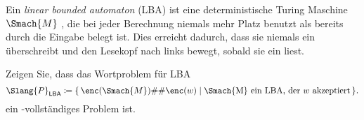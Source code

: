 \documentclass[german]{latteachCD}[2017/03/28]
\begin{document}
\begin{exercise}
  Ein \emph{linear bounded automaton} (LBA) ist eine deterministische Turing
  Maschine $\Smach{M}$ , die bei jeder Berechnung niemals mehr Platz benutzt als
  bereits durch die Eingabe belegt ist.  Dies erreicht  dadurch, dass
  sie niemals ein \textvisiblespace{} überschreibt und den Lesekopf nach links
  bewegt, sobald sie ein \textvisiblespace{} liest.

  Zeigen Sie, dass das Wortproblem für LBA
  \begin{equation*}
    \Slang{P}_{\mathsf{LBA}} \coloneqq \{\,\enc(\Smach{M})\#\#\enc(w) \mid
    \text{\Smach{M} ein LBA, der $w$ akzeptiert} \,\}.
  \end{equation*}
  ein \PSpace-vollständiges Problem ist.
\end{exercise}
\end{document}
